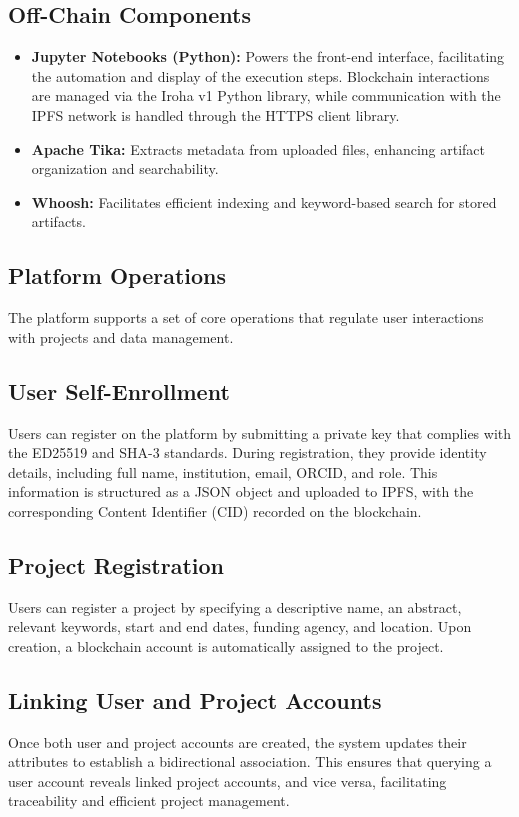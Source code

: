 \documentclass{article}
\begin{document}
\subsection{Off-Chain Components}
\begin{itemize}
    \item \textbf{Jupyter Notebooks (Python):} Powers the front-end interface, facilitating the automation and display of the execution steps. Blockchain interactions are managed via the Iroha v1 Python library, while communication with the IPFS network is handled through the HTTPS client library.
    \item \textbf{Apache Tika:} Extracts metadata from uploaded files, enhancing artifact organization and searchability.
    \item \textbf{Whoosh:} Facilitates efficient indexing and keyword-based search for stored artifacts.
\end{itemize}

\subsection{Platform Operations}
The platform supports a set of core operations that regulate user interactions with projects and data management.

\subsection{User Self-Enrollment}
Users can register on the platform by submitting a private key that complies with the ED25519 and SHA-3 standards. During registration, they provide identity details, including full name, institution, email, ORCID, and role. This information is structured as a JSON object and uploaded to IPFS, with the corresponding Content Identifier (CID) recorded on the blockchain.

\subsection{Project Registration}
Users can register a project by specifying a descriptive name, an abstract, relevant keywords, start and end dates, funding agency, and location. Upon creation, a blockchain account is automatically assigned to the project.

\subsection{Linking User and Project Accounts}
Once both user and project accounts are created, the system updates their attributes to establish a bidirectional association. This ensures that querying a user account reveals linked project accounts, and vice versa, facilitating traceability and efficient project management.
\end{document}
